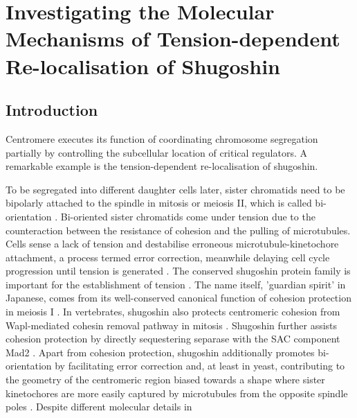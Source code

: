 \chapter{Investigating the Molecular Mechanisms of Tension-dependent Re-localisation of Shugoshin}

\section{Introduction}
Centromere executes its function of coordinating chromosome segregation partially by controlling the subcellular location of critical regulators. A remarkable example is the tension-dependent re-localisation of shugoshin. 

To be segregated into different daughter cells later, sister chromatids need to be bipolarly attached to the spindle in mitosis or meiosis II, which is called bi-orientation \citep{Tanaka2010Kinetochore-microtubuleBi-orientation}. Bi-oriented sister chromatids come under tension due to the counteraction between the resistance of cohesion and the pulling of microtubules. Cells sense a lack of tension and destabilise erroneous microtubule-kinetochore attachment, a process termed error correction, meanwhile delaying cell cycle progression until tension is generated \citep{Nicklas1997HowChromosomes, Nicklas1994, Tanaka2010Kinetochore-microtubuleBi-orientation}. The conserved shugoshin protein family is important for the establishment of tension \citep{Watanabe2005, Clift2011, Gutierrez-Caballero2012Shugoshins:Centromere, Marston2015, Zhang2020FunctioningMitosis}. The name itself, 'guardian spirit' in Japanese, comes from its well-conserved canonical function of cohesion protection in meiosis I \citep{Lister2010Age-relatedSgo2, Llano2008Shugoshin-2Mice, Lee2008, Rattani2013Sgol2Oocytes, Marston2004a, Kitajima2004a, Katis2004, Rabitsch2004TwoII, Kerrebrock1992TheDifferentiation, Cromer2013CentromericInterkinesis, Zamariola2014SHUGOSHINsThaliana, Wang2011OsSGO1Meiosis, Hamant2005AFunctions, Ma2021MeikinI, Miyazaki2017HierarchicalI}. In vertebrates, shugoshin also protects centromeric cohesion from Wapl-mediated cohesin removal pathway in mitosis \citep{Rivera2009ShugoshinExtracts, Shintomi2009ReleasingSgo1, Huang2007, Tang2006a, McGuinness2005ShugoshinCells, Kitajima2005, Salic2004VertebrateMitosis, Liang2019ACells}. Shugoshin further assists cohesion protection by directly sequestering separase with the SAC component Mad2 \citep{Rattani2013Sgol2Oocytes, Hellmuth2020Securin-independentShugoshinMAD2, Orth2011ShugoshinMad2}. Apart from cohesion protection, shugoshin additionally promotes bi-orientation by facilitating error correction \citep{Meppelink2015Shugoshin-1Bi-orientation, Huang2007, Peplowska2014, Nerusheva2014, Verzijlbergen2014, Tsukahara2010a, Yamagishi2010, Hadders2020UntanglingMitosis, Broad2020AuroraCells, Kawashima2007, Vanoosthuyse2007, Rivera2012} and, at least in yeast, contributing to the geometry of the centromeric region biased towards a shape where sister kinetochores are more easily captured by microtubules from the opposite spindle poles \citep{Indjeian2007, Haase2012Bub1Dynamics, Verzijlbergen2014, Peplowska2014, Sane2021ShugoshinDisassembly}. Despite different molecular details in 